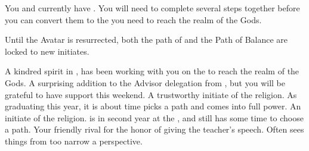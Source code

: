 \documentclass[char]{GL2020}
\begin{document}
\begin{itemz}[Notes]
	\item You and \cCurse{} currently have \iBeansNB{}. You will need to complete several steps together before you can convert them to the \iMagicBeans{} you need to reach the realm of the Gods.
	\item Until the \cEbb{} Avatar is resurrected, both the path of \cEbb{} and the Path of Balance are locked to new initiates.
\end{itemz}

\begin{contacts}
	\contact{\cCurse{}} A kindred spirit in \pFarm{}, \cCurse{} has been working with you on the \iMagicBeans{} to reach the realm of the Gods.
\contact{\cEbbPriest{}} A surprising addition to the Advisor delegation from \pShip{}, but you will be grateful to have \cEbbPriest{\their} support this weekend.
	\contact{\cInitiate{}} A trustworthy initiate of the \pShippies{} religion. As \cInitiate{\they} \cInitiate{\are} graduating this year, it is about time \cInitiate{} picks a path and comes into \cInitiate{\their} full power.
\contact{\cWarlordDaughter{}} An initiate of the \pShippies{} religion. \cWarlordDaughter{} is in \cWarlordDaughter{\their} second year at the \pSc{}, and still has some time to choose a path.
\contact{\cPirate{}} Your friendly rival for the honor of giving the teacher’s speech. Often sees things from too narrow a perspective.
\end{contacts}
\end{document}
